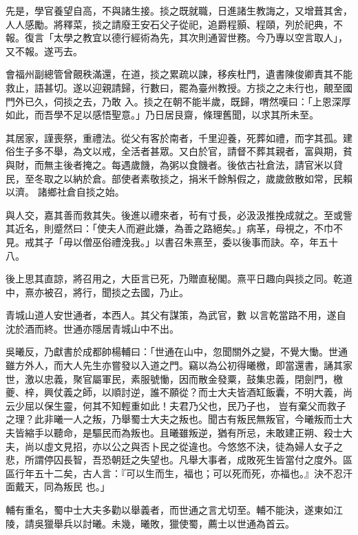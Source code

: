 \begin{pinyinscope}
 先是，學官養望自高，不與諸生接。掞之既就職，日進諸生教誨之，又增葺其舍，人人感勵。將釋菜，掞之請廢王安石父子從祀，追爵程顥、程頤，列於祀典，不報。復言「太學之教宜以德行經術為先，其次則通習世務。今乃專以空言取人」，又不報。遂丐去。



 會福州副總管曾覿秩滿還，在道，掞之累疏以諫，移疾杜門，遺書陳俊卿責其不能救止，語甚切。遂以迎親請歸，行數曰，罷為臺州教授。方掞之之未行也，覿至國門外已久，伺掞之去，乃敢
 入。掞之在朝不能半歲，既歸，喟然嘆曰：「上恩深厚如此，而吾學不足以感悟聖意。」乃日居艮齋，條理舊聞，以求其所未至。



 其居家，謹喪祭，重禮法。從父有客於南者，千里迎養，死葬如禮，而字其孤。建俗生子多不舉，為文以戒，全活者甚眾。又白於官，請督不葬其親者，富與期，貧與財，而無主後者掩之。每遇歲饑，為粥以食饑者。後依古社倉法，請官米以貸民，至冬取之以納於倉。部使者素敬掞之，捐米千餘斛假之，歲歲斂散如常，民賴以濟。
 諸鄉社倉自掞之始。



 與人交，嘉其善而救其失。後進以禮來者，茍有寸長，必汲汲推挽成就之。至或訾其近名，則蹙然曰：「使夫人而避此嫌，為善之路絕矣。」病革，母視之，不巾不見。戒其子「毋以僧巫俗禮浼我。」以書召朱熹至，委以後事而訣。卒，年五十八。



 後上思其直諒，將召用之，大臣言已死，乃贈直秘閣。熹平日趣向與掞之同。乾道中，熹亦被召，將行，聞掞之去國，乃止。



 青城山道人安世通者，本西人。其父有謀策，為武官，數
 以言乾當路不用，遂自沈於酒而終。世通亦隱居青城山中不出。



 吳曦反，乃獻書於成都帥楊輔曰：「世通在山中，忽聞關外之變，不覺大慟。世通雖方外人，而大人先生亦嘗發以入道之門。竊以為公初得曦檄，即當還書，誦其家世，激以忠義，聚官屬軍民，素服號慟，因而散金發粟，鼓集忠義，閉劍門，檄夔、梓，興仗義之師，以順討逆，誰不願從？而士大夫皆酒缸飯囊，不明大義，尚云少屈以保生靈，何其不知輕重如此！夫君乃父也，民乃子也，
 豈有棄父而救子之理？此非曦一人之叛，乃舉蜀士大夫之叛也。聞古有叛民無叛官，今曦叛而士大夫皆縮手以聽命，是驅民而為叛也。且曦雖叛逆，猶有所忌，未敢建正朔、殺士大夫，尚以虛文見招，亦以公之與否卜民之從違也。今悠悠不決，徒為婦人女子之悲，所謂停囚長智，吾恐朝廷之失望也。凡舉大事者，成敗死生皆當付之度外。區區行年五十二矣，古人言：『可以生而生，福也；可以死而死，亦福也。』決不忍汗面戴天，同為叛民
 也。」



 輔有重名，蜀中士大夫多勸以舉義者，而世通之言尤切至。輔不能決，遂東如江陵，請吳獵舉兵以討曦。未幾，曦敗，獵使蜀，薦士以世通為首云。




\end{pinyinscope}
